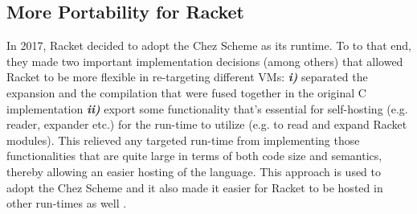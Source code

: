 \subsection[More Portability for Racket]{More Portability for Racket}
\label{subsec:racketcs}

In 2017, Racket decided to adopt the Chez Scheme as its runtime. To to
that end, they made two important implementation decisions (among
others) that allowed Racket to be more flexible in re-targeting
different VMs: \textit{\textbf{i)}} separated the expansion and the
compilation that were fused together in the original C implementation
\textit{\textbf{ii)}} export some functionality that's essential for
self-hosting (e.g. reader, expander etc.) for the run-time to utilize
(e.g. to read and expand Racket modules). This relieved any targeted
run-time from implementing those functionalities that are quite large
in terms of both code size and semantics, thereby allowing an easier
hosting of the language. This approach is used to adopt the Chez
Scheme and it also made it easier for Racket to be hosted in other
run-times as well \cite{racket-on-chez-19}.
